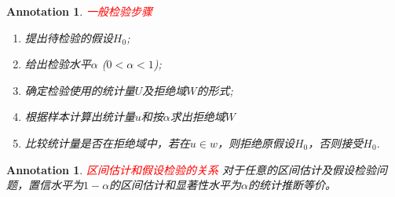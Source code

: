 \documentclass{article}
\newtheorem{annotation}[theorem]{Annotation}
\newcommand{\redt}[1]{\textcolor{red}{#1}}
\begin{document}
\begin{annotation}
\rm \redt{一般检验步骤}
\begin{enumerate}
	\item 提出待检验的假设$H_0$;
	\item 给出检验水平$\alpha$ ($0 < \alpha < 1$);
	\item 确定检验使用的统计量$U$及拒绝域$W$的形式;
	\item 根据样本计算出统计量$u$和按$\alpha$求出拒绝域$W$
	\item 比较统计量是否在拒绝域中，若在$u \in w $，则拒绝原假设$H_0$，否则接受$H_0$.
\end{enumerate}
\end{annotation}

\begin{annotation}
\rm \redt{区间估计和假设检验的关系} 对于任意的区间估计及假设检验问题，置信水平为$1-\alpha$的区间估计和显著性水平为$\alpha$的统计推断等价。
\end{annotation}
\end{document}
